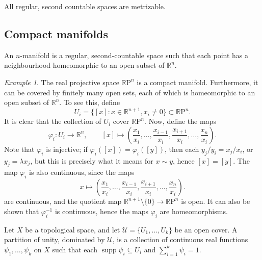\documentclass[11pt]{article}
\newcommand{\R}{\mathbb{R}}
\newcommand{\RP}{\R\mathrm{P}}
\DeclareMathOperator{\supp}{supp}
\theoremstyle{definition}
\theoremstyle{remark}
\newtheorem*{example}{Example}
\numberwithin{equation}{section}
\begin{document}
    \begin{theorem}
        All regular, second countable spaces are metrizable.
    \end{theorem}



    \subsection{Compact manifolds}
    
    \begin{definition}
        An $n$-manifold is a regular, second-countable space such that each point has
        a neighbourhood homeomorphic to an open subset of $\R^n$.
    \end{definition}
    \begin{example}
        The real projective space $\RP^n$ is a compact manifold. Furthermore, it can
        be covered by finitely many open sets, each of which is homeomorphic to an
        open subset of $\R^n$. To see this, define \[
            U_i = \{[x] : x \in \R^{n + 1},  x_i \neq 0\} \subset \RP^n.
        \] It is clear that the collection of $U_i$ cover $\RP^n$. Now, define the
        maps \[
            \varphi_i\colon U_i \to \R^n, \qquad [x] \mapsto \left(\frac{x_1}{x_i},
            \dots, \frac{x_{i - 1}}{x_i}, \frac{x_{i + 1}}{x_i}, \dots,
            \frac{x_n}{x_i}\right).
        \] Note that $\varphi_i$ is injective; if $\varphi_i([x]) = \varphi_i([y])$,
        then each $y_j/y_i = x_j/x_i$, or $y_j = \lambda x_j$, but this is precisely
        what it means for $x \sim y$, hence $[x] = [y]$. The map $\varphi_i$ is also
        continuous, since the maps \[
            x \mapsto \left(\frac{x_1}{x_i}, \dots, \frac{x_{i - 1}}{x_i}, \frac{x_{i
            + 1}}{x_i}, \dots, \frac{x_n}{x_i}\right).
        \] are continuous, and the quotient map $\R^{n + 1}\setminus\{0\} \to \RP^n$
        is open. It can also be shown that $\varphi_i^{-1}$ is continuous, hence the
        maps $\varphi_i$ are homeomorphisms.
    \end{example}

    \begin{definition}
        Let $X$ be a topological space, and let $\mathscr{U} = \{U_1, \dots, U_k\}$
        be an open cover. A partition of unity, dominated by $\mathscr{U}$, is a
        collection of continuous real functions $\psi_1, \dots, \psi_k$ on $X$
        such that each $\supp{\psi_i} \subseteq U_i$ and $\sum_{i = 1}^k \psi_i =
        1$.
    \end{definition}
\end{document}
